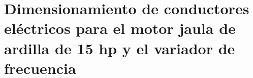 \section{Dimensionamiento de conductores eléctricos para el motor jaula de ardilla de 15 hp y el variador de frecuencia} 



